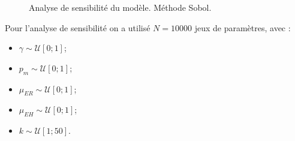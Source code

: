 \documentclass[a4paper, 11pt]{article}
\begin{document}
\begin{figure}[ht]
\centering
 \caption{Analyse de sensibilité du modèle. Méthode Sobol.}
 \label{fig:sobol}
\end{figure}


Pour l'analyse de sensibilité on a utilisé $N =  10000$ jeux de paramètres, avec :
\begin{itemize}
 \item $\gamma \sim \mathcal{U}[0; 1]$;
 \item $p_m \sim \mathcal{U}[0; 1]$;
 \item $\mu_{ER} \sim \mathcal{U}[0; 1]$;
 \item $\mu_{EH} \sim \mathcal{U}[0; 1]$;
 \item $k \sim \mathcal{U}[1;50]$.
\end{itemize}
\end{document}
